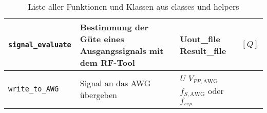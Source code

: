 \documentclass[../Report.tex]{subfiles}
\begin{document}
\begin{table}[H]
\begin{tabular}[t]{| >{\texttt\bgroup}m{3.5cm}<{\egroup}|m{8cm}|m{2cm}|m{2cm}|}
  \hline
  signal\_evaluate & Bestimmung der Güte eines Ausgangssignals mit dem RF-Tool \cite{RF-Tool} & Uout\_file \newline Result\_file & $[Q]$\\
  \hline
  write\_to\_AWG & Signal an das AWG übergeben & $U$ \newline $V_{PP,\textrm{AWG}}$  \newline $f_{S,\textrm{AWG}}$ oder $f_{rep}$ &  \\
  \hline
\end{tabular}
\caption{Liste aller Funktionen und Klassen aus classes und helpers}
\label{tab:anhang.Funktionen.class.helpers}
\end{table}
\end{document}
